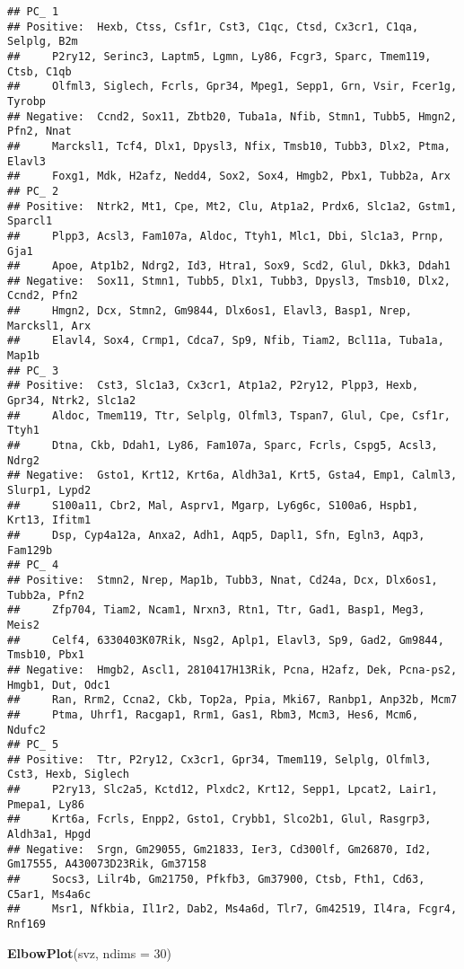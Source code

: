 \documentclass[
]{article}
\newenvironment{Shaded}{\begin{snugshade}}{\end{snugshade}}
\newcommand{\DataTypeTok}[1]{\textcolor[rgb]{0.13,0.29,0.53}{#1}}
\newcommand{\DecValTok}[1]{\textcolor[rgb]{0.00,0.00,0.81}{#1}}
\newcommand{\KeywordTok}[1]{\textcolor[rgb]{0.13,0.29,0.53}{\textbf{#1}}}
\newcommand{\NormalTok}[1]{#1}
\begin{document}
\begin{verbatim}
## PC_ 1 
## Positive:  Hexb, Ctss, Csf1r, Cst3, C1qc, Ctsd, Cx3cr1, C1qa, Selplg, B2m 
##     P2ry12, Serinc3, Laptm5, Lgmn, Ly86, Fcgr3, Sparc, Tmem119, Ctsb, C1qb 
##     Olfml3, Siglech, Fcrls, Gpr34, Mpeg1, Sepp1, Grn, Vsir, Fcer1g, Tyrobp 
## Negative:  Ccnd2, Sox11, Zbtb20, Tuba1a, Nfib, Stmn1, Tubb5, Hmgn2, Pfn2, Nnat 
##     Marcksl1, Tcf4, Dlx1, Dpysl3, Nfix, Tmsb10, Tubb3, Dlx2, Ptma, Elavl3 
##     Foxg1, Mdk, H2afz, Nedd4, Sox2, Sox4, Hmgb2, Pbx1, Tubb2a, Arx 
## PC_ 2 
## Positive:  Ntrk2, Mt1, Cpe, Mt2, Clu, Atp1a2, Prdx6, Slc1a2, Gstm1, Sparcl1 
##     Plpp3, Acsl3, Fam107a, Aldoc, Ttyh1, Mlc1, Dbi, Slc1a3, Prnp, Gja1 
##     Apoe, Atp1b2, Ndrg2, Id3, Htra1, Sox9, Scd2, Glul, Dkk3, Ddah1 
## Negative:  Sox11, Stmn1, Tubb5, Dlx1, Tubb3, Dpysl3, Tmsb10, Dlx2, Ccnd2, Pfn2 
##     Hmgn2, Dcx, Stmn2, Gm9844, Dlx6os1, Elavl3, Basp1, Nrep, Marcksl1, Arx 
##     Elavl4, Sox4, Crmp1, Cdca7, Sp9, Nfib, Tiam2, Bcl11a, Tuba1a, Map1b 
## PC_ 3 
## Positive:  Cst3, Slc1a3, Cx3cr1, Atp1a2, P2ry12, Plpp3, Hexb, Gpr34, Ntrk2, Slc1a2 
##     Aldoc, Tmem119, Ttr, Selplg, Olfml3, Tspan7, Glul, Cpe, Csf1r, Ttyh1 
##     Dtna, Ckb, Ddah1, Ly86, Fam107a, Sparc, Fcrls, Cspg5, Acsl3, Ndrg2 
## Negative:  Gsto1, Krt12, Krt6a, Aldh3a1, Krt5, Gsta4, Emp1, Calml3, Slurp1, Lypd2 
##     S100a11, Cbr2, Mal, Asprv1, Mgarp, Ly6g6c, S100a6, Hspb1, Krt13, Ifitm1 
##     Dsp, Cyp4a12a, Anxa2, Adh1, Aqp5, Dapl1, Sfn, Egln3, Aqp3, Fam129b 
## PC_ 4 
## Positive:  Stmn2, Nrep, Map1b, Tubb3, Nnat, Cd24a, Dcx, Dlx6os1, Tubb2a, Pfn2 
##     Zfp704, Tiam2, Ncam1, Nrxn3, Rtn1, Ttr, Gad1, Basp1, Meg3, Meis2 
##     Celf4, 6330403K07Rik, Nsg2, Aplp1, Elavl3, Sp9, Gad2, Gm9844, Tmsb10, Pbx1 
## Negative:  Hmgb2, Ascl1, 2810417H13Rik, Pcna, H2afz, Dek, Pcna-ps2, Hmgb1, Dut, Odc1 
##     Ran, Rrm2, Ccna2, Ckb, Top2a, Ppia, Mki67, Ranbp1, Anp32b, Mcm7 
##     Ptma, Uhrf1, Racgap1, Rrm1, Gas1, Rbm3, Mcm3, Hes6, Mcm6, Ndufc2 
## PC_ 5 
## Positive:  Ttr, P2ry12, Cx3cr1, Gpr34, Tmem119, Selplg, Olfml3, Cst3, Hexb, Siglech 
##     P2ry13, Slc2a5, Kctd12, Plxdc2, Krt12, Sepp1, Lpcat2, Lair1, Pmepa1, Ly86 
##     Krt6a, Fcrls, Enpp2, Gsto1, Crybb1, Slco2b1, Glul, Rasgrp3, Aldh3a1, Hpgd 
## Negative:  Srgn, Gm29055, Gm21833, Ier3, Cd300lf, Gm26870, Id2, Gm17555, A430073D23Rik, Gm37158 
##     Socs3, Lilr4b, Gm21750, Pfkfb3, Gm37900, Ctsb, Fth1, Cd63, C5ar1, Ms4a6c 
##     Msr1, Nfkbia, Il1r2, Dab2, Ms4a6d, Tlr7, Gm42519, Il4ra, Fcgr4, Rnf169
\end{verbatim}

\begin{Shaded}
\begin{Highlighting}[]
\KeywordTok{ElbowPlot}\NormalTok{(svz, }\DataTypeTok{ndims =} \DecValTok{30}\NormalTok{)}
\end{Highlighting}
\end{Shaded}
\end{document}
